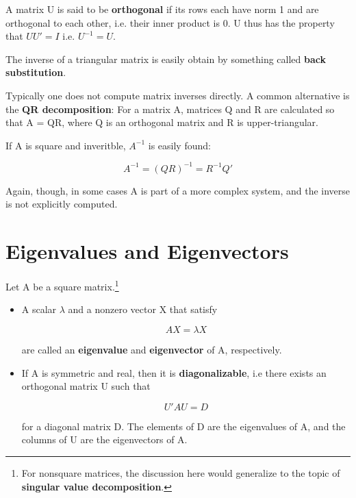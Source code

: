 A matrix U is said to be {\bf orthogonal} if its rows each have norm 1
and are orthogonal to each other, i.e. their inner product is 0.  U thus
has the property that $U U' = I$ i.e. $U^{-1} = U$.

The inverse of a triangular matrix is easily obtain by something called
{\bf back substitution}.

Typically one does not compute matrix inverses directly.  A common
alternative is the {\bf QR decomposition}:  For a matrix A,
matrices Q and R are calculated so that A = QR, where Q is an orthogonal
matrix and R is upper-triangular.  

If A is square and inveritble, $A^{-1}$ is easily found: 

\begin{equation}
A^{-1} = (QR)^{-1} = R^{-1} Q'
\end{equation}

Again, though, in some cases A is part of a more complex system, and the
inverse is not explicitly computed.

\section{Eigenvalues and Eigenvectors}

Let A be a square matrix.\footnote{For nonsquare matrices, the
discussion here would generalize to the topic of {\bf singular value
decomposition}.}  

\begin{itemize}

\item A scalar $\lambda$ and a nonzero vector X that satisfy

\begin{equation}
AX = \lambda X
\end{equation}

are called an {\bf eigenvalue} and {\bf eigenvector} of A, respectively.

\item If A is symmetric and real, then it is {\bf diagonalizable}, i.e
there exists an orthogonal matrix U such that

\begin{equation}
U'AU = D
\end{equation}

for a diagonal matrix D.  The elements of D are the eigenvalues of A,
and the columns of U are the eigenvectors of A.

\end{itemize}


